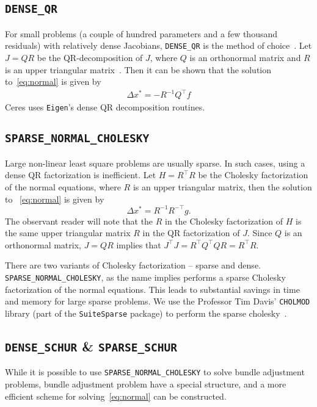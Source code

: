 \subsection{\texttt{DENSE\_QR}}
For small problems (a couple of hundred parameters and a few thousand residuals) with relatively dense Jacobians, \texttt{DENSE\_QR} is the method of choice~\cite{bjorck1996numerical}. Let $J = QR$ be the QR-decomposition of $J$, where $Q$ is an orthonormal matrix and $R$ is an upper triangular matrix~\cite{trefethen1997numerical}. Then it can be shown that the solution to~\eqref{eq:normal} is given by
\begin{align}
    \Delta x^* = -R^{-1}Q^\top f
\end{align}
Ceres uses \texttt{Eigen}'s dense QR decomposition routines.


\subsection{\texttt{SPARSE\_NORMAL\_CHOLESKY}}
Large non-linear least square problems are usually sparse. In such cases, using a dense QR factorization is inefficient. Let $H = R^\top R$ be the Cholesky factorization of the normal equations, where $R$ is an upper triangular matrix, then the  solution to ~\eqref{eq:normal} is given by
\begin{equation}
    \Delta x^* = R^{-1} R^{-\top} g.
\end{equation}
The observant reader will note that the $R$ in the Cholesky factorization of $H$ is the same upper triangular matrix $R$ in the QR factorization of $J$. Since $Q$ is an orthonormal matrix, $J=QR$ implies that $J^\top J = R^\top Q^\top Q R = R^\top R$.


There are two variants of Cholesky factorization -- sparse and dense. \texttt{SPARSE\_NORMAL\_CHOLESKY}, as the name implies performs a sparse Cholesky factorization of the normal equations. This leads to substantial savings in time and memory for large sparse problems. We use the Professor Tim Davis' \texttt{CHOLMOD} library (part of the \texttt{SuiteSparse} package) to perform the sparse cholesky~\cite{chen2006acs}.


\subsection{\texttt{DENSE\_SCHUR} \& \texttt{SPARSE\_SCHUR}}
While it is possible to use \texttt{SPARSE\_NORMAL\_CHOLESKY} to solve bundle adjustment problems, bundle adjustment problem have a special structure, and a more efficient scheme for solving~\eqref{eq:normal} can be constructed.

